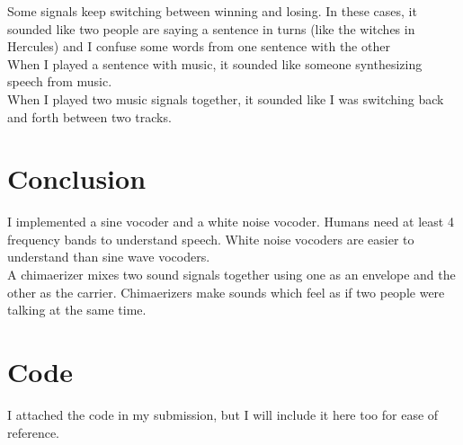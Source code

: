 \documentclass[11pt]{article}
\begin{document}
Some signals keep switching between winning and losing.
In these cases, it sounded like two people are saying a sentence in turns (like the witches in Hercules)
and I confuse some words from one sentence with the other\\

 
When I played a sentence with music,
it sounded like someone synthesizing speech from music.\\

When I played two music signals together, it sounded like I was switching back and forth 
between two tracks.

\section{Conclusion}

I implemented a sine vocoder and a white noise vocoder.
Humans need at least 4 frequency bands to understand speech.
White noise vocoders are easier to understand than sine wave vocoders.\\

A chimaerizer mixes two sound signals together using one as an envelope
and the other as the carrier.
Chimaerizers make sounds which feel as if two people were talking at the same time.

\section{Code}

I attached the code in my submission, but I will include it here too for ease of reference.














\end{document}
